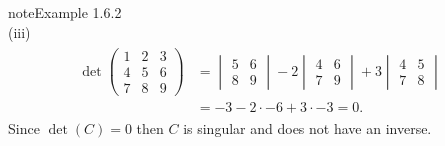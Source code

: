 \documentclass[letterpaper,10pt,english]{jupyterBook}
\begin{document}
\begin{sphinxadmonition}{note}{Example 1.6.2}
\begin{equation*}
\end{equation*}
\sphinxAtStartPar
(iii)
\begin{equation*}
\begin{split} \begin{align*}
    \det\begin{pmatrix}1 & 2 & 3 \\ 4 & 5 & 6 \\ 7 & 8 & 9 \end{pmatrix} &=
    \begin{vmatrix} 5 & 6 \\ 8 & 9 \end{vmatrix} - 2
    \begin{vmatrix} 4 & 6 \\ 7 & 9 \end{vmatrix} + 3
    \begin{vmatrix} 4 & 5 \\ 7 & 8 \end{vmatrix} \\
    &= -3 - 2 \cdot -6 + 3 \cdot -3 = 0.
\end{align*} \end{split}
\end{equation*}
\sphinxAtStartPar
Since \(\det(C)=0\) then \(C\) is singular and does not have an inverse.
\end{sphinxadmonition}
\end{document}
